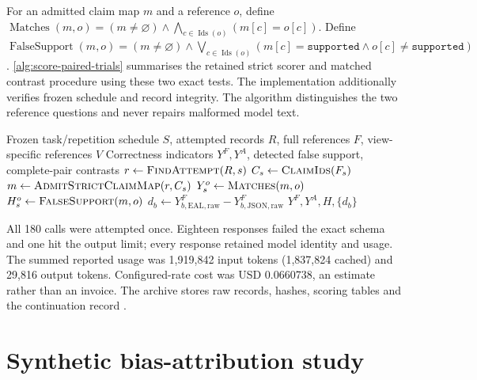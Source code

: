 \documentclass[preprint,12pt]{elsarticle}
\begin{document}
For an admitted claim map \(m\) and a reference \(o\), define
\(\operatorname{Matches}(m,o)=(m\neq\varnothing)\land
\bigwedge_{c\in\operatorname{Ids}(o)}(m[c]=o[c])\).
Define \(\operatorname{FalseSupport}(m,o)=(m\neq\varnothing)\land
\bigvee_{c\in\operatorname{Ids}(o)}
(m[c]=\texttt{supported}\land o[c]\neq\texttt{supported})\).
\autoref{alg:score-paired-trials} summarises the retained strict scorer and matched contrast procedure using these two exact tests. The implementation additionally verifies frozen schedule and record integrity. The algorithm distinguishes the two reference questions and never repairs malformed model text.
\begin{algorithm}[H]
  \caption{Strictly score retained trials against both references and pair notation outcomes}
  \label{alg:score-paired-trials}
  \begin{algorithmic}[1]
    \Require Frozen task/repetition schedule \(S\), attempted records \(R\),
      full references \(F\), view-specific references \(V\)
    \Ensure Correctness indicators \(Y^F,Y^A\), detected false support,
      complete-pair contrasts
      \State \(r\gets\Call{FindAttempt}{R,s}\)
      \State \(C_s\gets\Call{ClaimIds}{F_s}\)
      \State \(m\gets\Call{AdmitStrictClaimMap}{r,C_s}\)
        \State \(Y^o_s\gets\Call{Matches}{m,o}\)
        \State \(H^o_s\gets\Call{FalseSupport}{m,o}\)
      \EndFor
    \EndFor
        \State \(d_b\gets
          Y^F_{b,\mathrm{EAL,raw}}-Y^F_{b,\mathrm{JSON,raw}}\)
      \EndIf
    \EndFor
    \State \Return \(Y^F,Y^A,H,\{d_b\}\)
  \end{algorithmic}
\end{algorithm}

All 180 calls were attempted once. Eighteen responses failed the exact schema and one hit the output limit; every response retained model identity and usage. The summed reported usage was 1,919,842 input tokens (1,837,824 cached) and 29,816 output tokens. Configured-rate cost was USD 0.0660738, an estimate rather than an invoice. The archive stores raw records, hashes, scoring tables and the continuation record \citep{earlNotation}.

\section{Synthetic bias-attribution study}\label{sec:bias-stage-a}
\end{document}
